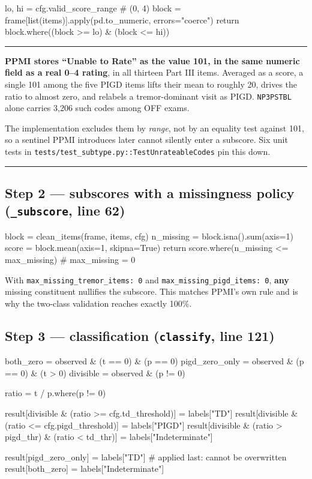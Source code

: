 \documentclass[11pt,a4paper]{article}
\newcommand{\code}[1]{\texttt{\small #1}}
\newenvironment{keypoint}
  {\begin{center}\begin{minipage}{0.95\textwidth}%
   \vspace{4pt}\hrule\vspace{7pt}\small}
  {\vspace{7pt}\hrule\vspace{4pt}\end{minipage}\end{center}}
\begin{document}
\begin{codeblock}
lo, hi = cfg.valid_score_range                     # (0, 4)
block = frame[list(items)].apply(pd.to_numeric, errors="coerce")
return block.where((block >= lo) & (block <= hi))
\end{codeblock}

\begin{keypoint}
\textbf{PPMI stores ``Unable to Rate'' as the value 101, in the same numeric
field as a real 0--4 rating}, in all thirteen Part III items. Averaged as a
score, a single 101 among the five PIGD items lifts their mean to roughly
20, drives the ratio to almost zero, and relabels a tremor-dominant visit as
PIGD. \code{NP3PSTBL} alone carries 3{,}206 such codes among OFF exams.

The implementation excludes them by \emph{range}, not by an equality test
against 101, so a sentinel PPMI introduces later cannot silently enter a
subscore. Six unit tests in \code{tests/test\_subtype.py::TestUnrateableCodes}
pin this down.
\end{keypoint}

\subsection{Step 2 --- subscores with a missingness policy \quad (\code{\_subscore}, line 62)}

\begin{codeblock}
block = clean_items(frame, items, cfg)
n_missing = block.isna().sum(axis=1)
score = block.mean(axis=1, skipna=True)
return score.where(n_missing <= max_missing)       # max_missing = 0
\end{codeblock}

\noindent
With \code{max\_missing\_tremor\_items: 0} and
\code{max\_missing\_pigd\_items: 0}, \textbf{any} missing constituent nullifies
the subscore. This matches PPMI's own rule and is why the two-class validation
reaches exactly 100\%.

\subsection{Step 3 --- classification \quad (\code{classify}, line 121)}

\begin{codeblock}
both_zero      = observed & (t == 0) & (p == 0)
pigd_zero_only = observed & (p == 0) & (t > 0)
divisible      = observed & (p != 0)

ratio = t / p.where(p != 0)

result[divisible & (ratio >= cfg.td_threshold)]   = labels["TD"]
result[divisible & (ratio <= cfg.pigd_threshold)] = labels["PIGD"]
result[divisible & (ratio > pigd_thr) & (ratio < td_thr)] = labels["Indeterminate"]

result[pigd_zero_only] = labels["TD"]              # applied last: cannot be overwritten
result[both_zero]      = labels["Indeterminate"]
\end{codeblock}
\end{document}
